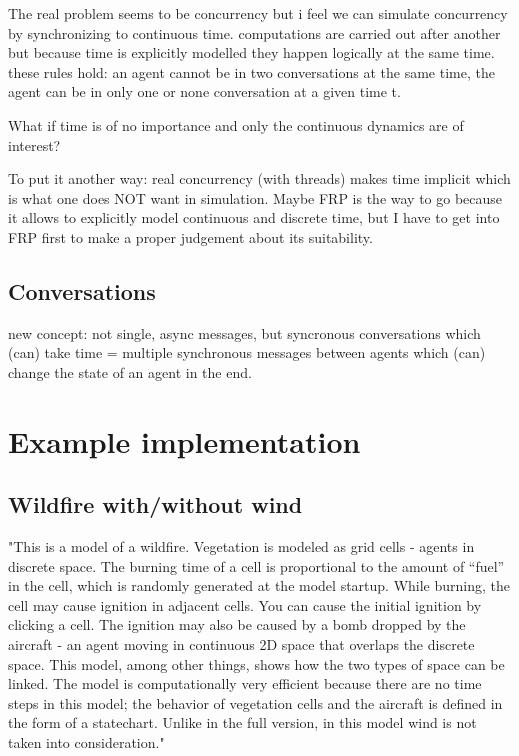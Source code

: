 \documentclass{article}
\begin{document}
The real problem seems to be concurrency but i feel we can simulate concurrency by synchronizing to continuous time. computations are carried out after another but because time is explicitly modelled they happen logically at the same time. these rules hold: an agent cannot be in two conversations at the same time, the agent can be in only one or none conversation at a given time t.

What if time is of no importance and only the continuous dynamics are of interest?

To put it another way: real concurrency (with threads) makes time implicit which is what one does NOT want in simulation. Maybe FRP is the way to go because it allows to explicitly model continuous and discrete time, but I have to get into FRP first to make a proper judgement about its suitability.

\subsection{Conversations}
new concept: not single, async messages, but syncronous conversations which (can) take time = multiple synchronous messages between agents which (can) change the state of an agent in the end.

\section{Example implementation}

\subsection{Wildfire with/without wind}
"This is a model of a wildfire. Vegetation is modeled as grid cells - agents in discrete space. The burning time of a cell is proportional to the amount of “fuel” in the cell, which is randomly generated at the model startup. While burning, the cell may cause ignition in adjacent cells. You can cause the initial ignition by clicking a cell. The ignition may also be caused by a bomb dropped by the aircraft - an agent moving in continuous 2D space that overlaps the discrete space. This model, among other things, shows how the two types of space can be linked. The model is computationally very efficient because there are no time steps in this model; the behavior of vegetation cells and the aircraft is defined in the form of a statechart. Unlike in the full version, in this model wind is not taken into consideration."
\end{document}
